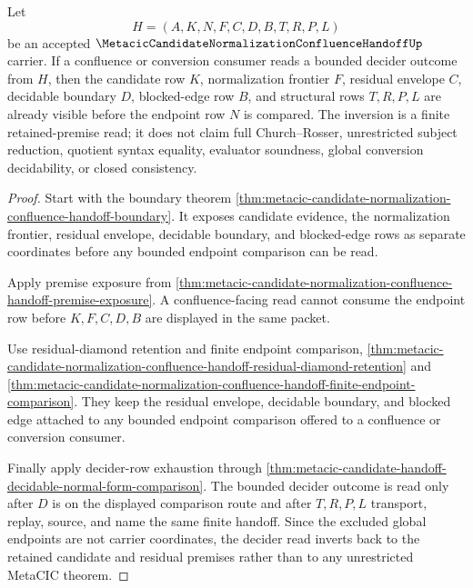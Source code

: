 \begin{theorem}
\label{thm:metacic-candidate-normalization-confluence-handoff-residual-decider-inversion}
Let
$$
H=(A,K,N,F,C,D,B,T,R,P,L)
$$
be an accepted $\MetacicCandidateNormalizationConfluenceHandoffUp$ carrier. If a confluence or conversion consumer reads a bounded decider outcome from $H$, then the candidate row $K$, normalization frontier $F$, residual envelope $C$, decidable boundary $D$, blocked-edge row $B$, and structural rows $T,R,P,L$ are already visible before the endpoint row $N$ is compared. The inversion is a finite retained-premise read; it does not claim full Church--Rosser, unrestricted subject reduction, quotient syntax equality, evaluator soundness, global conversion decidability, or closed consistency.
\end{theorem}
\begin{proof}
Start with the boundary theorem \autoref{thm:metacic-candidate-normalization-confluence-handoff-boundary}. It exposes candidate evidence, the normalization frontier, residual envelope, decidable boundary, and blocked-edge rows as separate coordinates before any bounded endpoint comparison can be read.

Apply premise exposure from \autoref{thm:metacic-candidate-normalization-confluence-handoff-premise-exposure}. A confluence-facing read cannot consume the endpoint row before $K,F,C,D,B$ are displayed in the same packet.

Use residual-diamond retention and finite endpoint comparison, \autoref{thm:metacic-candidate-normalization-confluence-handoff-residual-diamond-retention} and \autoref{thm:metacic-candidate-normalization-confluence-handoff-finite-endpoint-comparison}. They keep the residual envelope, decidable boundary, and blocked edge attached to any bounded endpoint comparison offered to a confluence or conversion consumer.

Finally apply decider-row exhaustion through \autoref{thm:metacic-candidate-handoff-decidable-normal-form-comparison}. The bounded decider outcome is read only after $D$ is on the displayed comparison route and after $T,R,P,L$ transport, replay, source, and name the same finite handoff. Since the excluded global endpoints are not carrier coordinates, the decider read inverts back to the retained candidate and residual premises rather than to any unrestricted MetaCIC theorem.
\end{proof}

